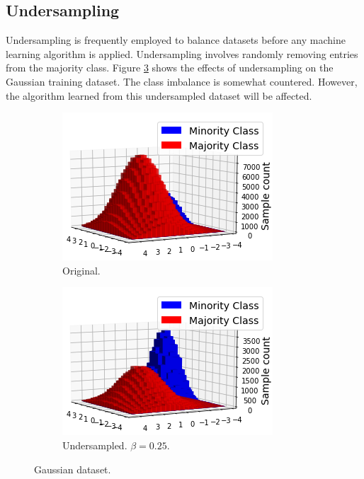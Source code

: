 \documentclass[conference]{IEEEtran}
\begin{document}
	\subsection{Undersampling}
		Undersampling is frequently employed to balance datasets before any machine learning algorithm is applied. Undersampling involves randomly removing entries from the majority class. Figure \ref{fig:Undersampling_2D_OriginalHistograms} shows the effects of undersampling on the Gaussian training dataset. The class imbalance is somewhat countered. However, the algorithm learned from this undersampled dataset will be affected.
			\begin{figure}[h]
			     \centering
			     \begin{subfigure}[b]{0.24\textwidth}
			         \centering
			         \includegraphics[width=\textwidth]{Undersampling_2D_OriginalDataset}
			         \caption{Original.}
			         \label{fig:Undersampling_2D_OriginalDataset}
			     \end{subfigure}
			     \hfill
			     \begin{subfigure}[b]{0.24\textwidth}
			         \centering
			         \includegraphics[width=\textwidth]{Undersampling_2D_UndersampledDataset}
			         \caption{Undersampled. $\beta=0.25$.}
			         \label{fig:Undersampling_2D_UndersampledDataset}
			     \end{subfigure}
			        \caption{Gaussian dataset.}
			        \label{fig:Undersampling_2D_OriginalHistograms}
			\end{figure}
\end{document}
